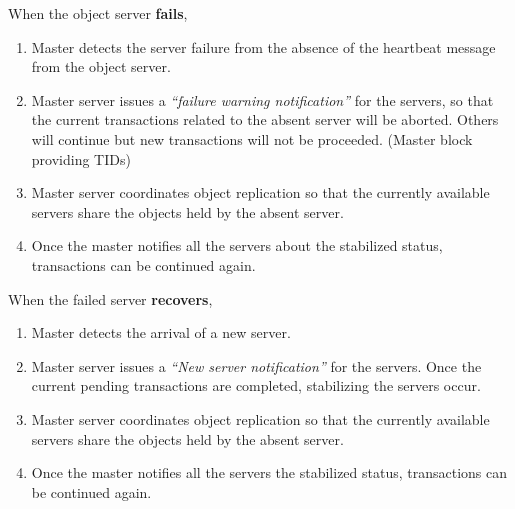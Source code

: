 \documentclass[times, 10pt,twocolumn]{article}
\begin{document}
When the object server {\bf fails},
\begin{enumerate}
\item Master detects the server failure from the absence of the heartbeat message from the object server.
\item Master server issues a {\it “failure warning notification”} for the servers, so that the current transactions related to the absent server will be aborted.
Others will continue but new transactions will not be proceeded. (Master block providing TIDs)
\item Master server coordinates object replication so that the currently available servers share the objects held by the absent server.
\item Once the master notifies all the servers about the stabilized status, transactions can be continued again.
\end{enumerate}

When the failed server {\bf recovers},
\begin{enumerate}
\item Master detects the arrival of a new server.
\item Master server issues a {\it “New server notification”} for the servers. Once the current pending transactions are completed, stabilizing the servers occur.
\item Master server coordinates object replication so that the currently available servers share the objects held by the absent server.
\item Once the master notifies all the servers the stabilized status, transactions can be continued again.
\end{enumerate}








\end{document}
